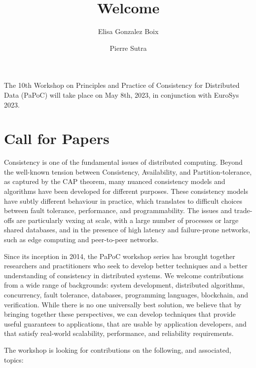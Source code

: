 \documentclass[sigplan,review,anonymous]{acmart}
\begin{document}
\title{Welcome}
\author{Elisa Gonzalez Boix}
\author{Pierre Sutra}
\maketitle
\vspace{-0.5cm}

The 10th Workshop on Principles and Practice of Consistency for Distributed Data (PaPoC) will take place on May 8th, 2023, in conjunction with EuroSys 2023.

\section*{Call for Papers}

Consistency is one of the fundamental issues of distributed computing. 
Beyond the well-known tension between Consistency, Availability, and Partition-tolerance, as captured by the CAP theorem, many nuanced consistency models and algorithms have been developed for different purposes. 
These consistency models have subtly different behaviour in practice, which translates to difficult choices between fault tolerance, performance, and programmability.
The issues and trade-offs are particularly vexing at scale, with a large number of processes or large shared databases, and in the presence of high latency and failure-prone networks, such as edge computing and peer-to-peer networks.

Since its inception in 2014, the PaPoC workshop series has brought together researchers and practitioners who seek to develop better techniques and a better understanding of consistency in distributed systems. 
We welcome contributions from a wide range of backgrounds: system development, distributed algorithms, concurrency, fault tolerance, databases, programming languages, blockchain, and verification. 
While there is no one universally best solution, we believe that by bringing together these perspectives, we can develop techniques that provide useful guarantees to applications, that are usable by application developers, and that satisfy real-world scalability, performance, and reliability requirements.

The workshop is looking for contributions on the following, and associated, topics:
\end{document}
